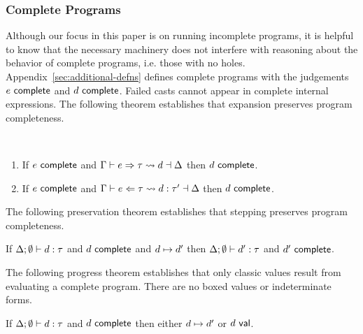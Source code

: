 \subsubsection{Complete Programs} 
Although our focus in this paper is on running incomplete programs, it is helpful to know that the necessary machinery does not interfere with reasoning about the behavior of complete programs, i.e. those with no holes. 
Appendix~\ref{sec:additional-defns} defines complete programs with the judgements $e~\mathsf{complete}$ and $d~\mathsf{complete}$. 
Failed casts cannot appear in complete internal expressions. 
The following theorem establishes that expansion preserves program completeness.
\begin{thm} ~
  \begin{enumerate}[nolistsep]
    \item
      If $e~\mathsf{complete}$
      and $\Gamma \vdash e \Rightarrow \tau \leadsto d \dashv \Delta$
      then $d~\mathsf{complete}$.
    \item
      If $e~\mathsf{complete}$
      and $\Gamma \vdash e \Leftarrow \tau \leadsto d : \tau' \dashv \Delta$
      then $d~\mathsf{complete}$.
  \end{enumerate}
\end{thm}

The following preservation theorem establishes that stepping preserves program completeness.
\begin{thm}
  If $\Delta; \emptyset \vdash d : \tau$
  and $d~\mathsf{complete}$
  and $d \mapsto d'$
  then $\Delta; \emptyset \vdash d' : \tau$
  and $d'~\mathsf{complete}$.
\end{thm}

The following progress theorem establishes that only classic values result from evaluating a complete program. There are no boxed values or indeterminate forms. 
\begin{thm}
  If $\Delta; \emptyset \vdash d : \tau$
  and $d~\mathsf{complete}$
  then either $d \mapsto d'$
  or $d~\mathsf{val}$.
\end{thm}



